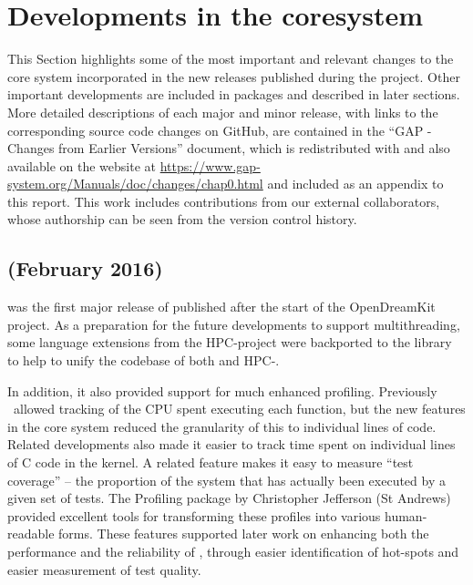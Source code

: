 \documentclass{deliverablereport}
\author{Author names}
\begin{document}
\maketitle
\githubissuedescription




\section{Developments in the core\GAP system}\label{core-gap}

This Section highlights some of the most important and relevant
changes to the core \GAP system incorporated in the new \GAP releases
published during the project. Other important developments are
included in \GAP packages and described in later sections.  More
detailed descriptions of each major and minor \GAP release, with links
to the corresponding source code changes on GitHub, are contained in
the ``GAP - Changes from Earlier Versions'' document, which is
redistributed with \GAP and also available on the \GAP website at
\url{https://www.gap-system.org/Manuals/doc/changes/chap0.html} and
included as an appendix to this report. This
work includes contributions from our external collaborators, whose
authorship can be seen from the version control history.

\subsection{ (February 2016)}\label{gap-4.8}

 was the first major release of \GAP published
after the start of the OpenDreamKit project.
As a preparation for the future developments to support multithreading, 
some language extensions from the HPC-\GAP project were backported to the 
\GAP library to help to unify the codebase of both  and HPC-\GAP. 

In addition, it also provided support for much enhanced
profiling. Previously \GAP\ allowed tracking of the CPU spent
executing each function, but the new features in
the core system reduced the granularity of this to individual lines of
\GAP code. Related developments also made it easier to track time
spent on individual lines of C code in the \GAP kernel. A related
feature makes it easy to measure ``test coverage'' -- the proportion
of the system that has actually been executed by a given set of
tests. The {\sf Profiling} package by
Christopher Jefferson (St Andrews) provided excellent tools for transforming these profiles
into various human-readable forms. These features 
supported later  work on enhancing both the performance and the
reliability of \GAP, through easier identification of hot-spots and
easier measurement of test quality.
\end{document}
